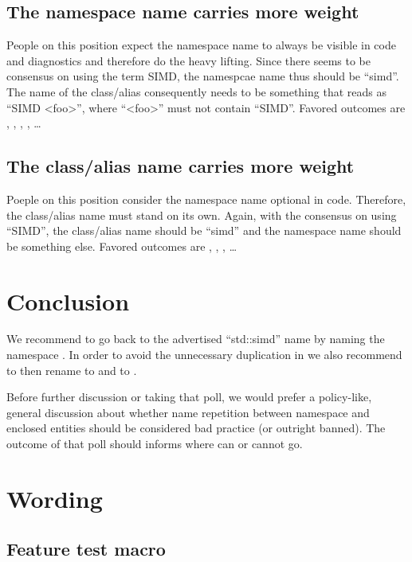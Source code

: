 \subsection{The namespace name carries more weight}
People on this position expect the namespace name to always be visible in code and diagnostics and
therefore do the heavy lifting.
Since there seems to be consensus on using the term SIMD, the namespcae name thus should be “simd”.
The name of the class/alias consequently needs to be something that reads as “SIMD <foo>”, where
“<foo>” must not contain “SIMD”.
Favored outcomes are \stdsimd{}, \stdsimd{}, \stdsimd{},
\stdsimd{}, \ldots

\subsection{The class/alias name carries more weight}
Poeple on this position consider the namespace name optional in code.
Therefore, the class/alias name must stand on its own.
Again, with the consensus on using “SIMD”, the class/alias name should be “simd” and the namespace
name should be something else.
Favored outcomes are \stddatapar{}, \std{},
\std{}, \ldots

\section{Conclusion}

We recommend to go back to the advertised “std::simd” name by naming the namespace
.
In order to avoid the unnecessary duplication in \stdsimd{} we also recommend to
then rename \stdsimd{} to \stdsimd{} and \stdsimd{}
to \stdsimd{}.

Before further discussion or taking that poll, we would prefer a policy-like, general discussion
about whether name repetition between namespace and enclosed entities should be considered bad
practice (or outright banned).
The outcome of that poll should informs where  can or cannot go.

\section{Wording}

\subsection{Feature test macro}

